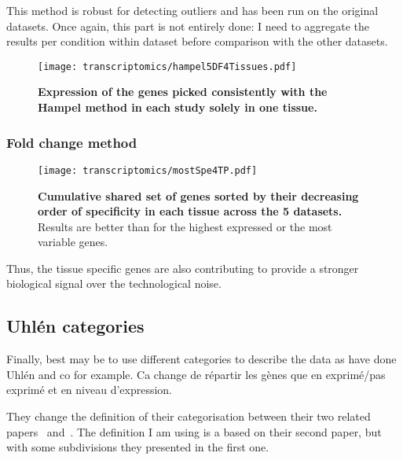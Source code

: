 This method is robust for detecting outliers and has been run on the original datasets.
Once again, this part is not entirely done: I need to aggregate the results per condition within dataset before comparison with the other datasets.



\begin{figure}[!htpb]
    \texttt{[image: transcriptomics/hampel5DF4Tissues.pdf]}\centering
    \caption[Expression of the genes picked with Hampel method]{\label{fig:hampelExp}%
    \textbf{Expression of the genes picked consistently with the Hampel method
    in each study solely in one tissue.}}
\end{figure}



\subsubsection{Fold change method}\label{subsub:TisSpeGeneMethodPerso}

\begin{figure}[!htpb]
    \texttt{[image: transcriptomics/mostSpe4TP.pdf]}\centering
    \caption[Cumulative shared set of genes sorted by their specificity in each
    tissue across the 5 datasets]{\label{fig:mostSpe4T}\textbf{Cumulative shared
    set of genes sorted by their decreasing order of specificity in each tissue
    across the 5 datasets.} Results are better than for the highest expressed or
    the most variable genes.}
\end{figure}

Thus, the tissue specific genes are also contributing to provide a stronger
biological signal over the technological noise.

\subsection{Uhlén categories}\label{sub:UhlenGeneCat}

Finally, best may be to use different categories to describe the data as have
done Uhlén and co for example. Ca change de répartir les gènes que en exprimé/pas exprimé
et en niveau d'expression.

They change the definition of their categorisation
between their two related papers~ and~.
The definition I am using is a based on their second paper,
but with some subdivisions they presented in the first one.

